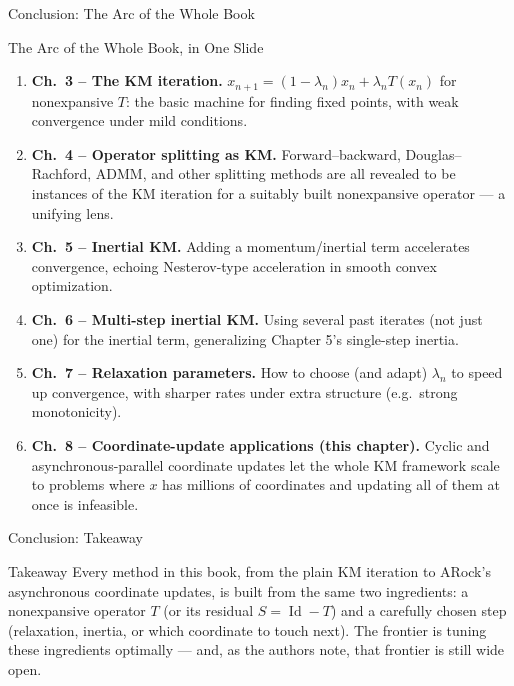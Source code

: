 \documentclass[aspectratio=169,10pt]{beamer}
\newcommand{\Id}{\operatorname{Id}}
\begin{document}
\begin{frame}{Conclusion: The Arc of the Whole Book}

\begin{block}{The Arc of the Whole Book, in One Slide}
\begin{enumerate}
  \item \textbf{Ch.~3 -- The KM iteration.} $x_{n+1}=(1-\lambda_n)x_n+\lambda_n T(x_n)$ for nonexpansive $T$: the basic machine for finding fixed points, with weak convergence under mild conditions.
  \item \textbf{Ch.~4 -- Operator splitting as KM.} Forward--backward, Douglas--Rachford, ADMM, and other splitting methods are all revealed to be instances of the KM iteration for a suitably built nonexpansive operator --- a unifying lens.
  \item \textbf{Ch.~5 -- Inertial KM.} Adding a momentum/inertial term accelerates convergence, echoing Nesterov-type acceleration in smooth convex optimization.
  \item \textbf{Ch.~6 -- Multi-step inertial KM.} Using several past iterates (not just one) for the inertial term, generalizing Chapter 5's single-step inertia.
  \item \textbf{Ch.~7 -- Relaxation parameters.} How to choose (and adapt) $\lambda_n$ to speed up convergence, with sharper rates under extra structure (e.g.\ strong monotonicity).
  \item \textbf{Ch.~8 -- Coordinate-update applications (this chapter).} Cyclic and asynchronous-parallel coordinate updates let the whole KM framework scale to problems where $x$ has millions of coordinates and updating all of them at once is infeasible.
\end{enumerate}
\end{block}

\end{frame}

\begin{frame}{Conclusion: Takeaway}

\begin{alertblock}{Takeaway}
Every method in this book, from the plain KM iteration to ARock's asynchronous coordinate updates, is built from the same two ingredients: a nonexpansive operator $T$ (or its residual $S=\Id-T$) and a carefully chosen step (relaxation, inertia, or which coordinate to touch next). The frontier is tuning these ingredients optimally --- and, as the authors note, that frontier is still wide open.
\end{alertblock}

\end{frame}
\end{document}
